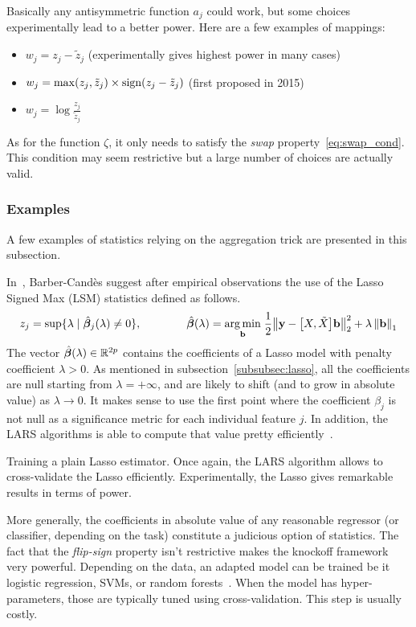 Basically any antisymmetric function $a_j$ could work, but some choices experimentally lead to a better power.
Here are a few examples of mappings:
\begin{itemize}
    \item $w_j = z_j - \tilde{z}_j$ (experimentally gives highest power in many cases)
    \item $w_j = \max(z_j, \tilde{z}_j) \times \operatorname*{sign}(z_j - \tilde{z}_j)$ (first proposed in 2015)
    \item $w_j = \log\frac{z_j}{\tilde{z}_j}$
\end{itemize}
As for the function $\zeta$, it only needs to satisfy the \emph{swap} property~\ref{eq:swap_cond}.
This condition may seem restrictive but a large number of choices are actually valid.

\subsubsection{Examples}\label{subsubsec:sce}

A few examples of statistics relying on the aggregation trick are presented in this subsection.

In~\cite{fixed_x_knockoffs}, Barber-Candès suggest after empirical observations the use of the
Lasso Signed Max (LSM) statistics defined as follows.
\begin{equation}
    z_j = \sup\{\lambda \mid \hat{\bm{\beta}}_j(\lambda) \neq 0\}
    ,\qquad\qquad
    \hat{\bm{\beta}}(\lambda) =
    \underset{\mathbf{b}}{\operatorname*{arg\,min}}\;
    \frac{1}{2}\big\lVert \mathbf{y} - \big[ X, \tilde{X} \big]\mathbf{b} \big\rVert_2^2 + \lambda\left\lVert\mathbf{b}\right\rVert_1
\end{equation}
The vector $\hat{\bm{\beta}}(\lambda) \in \mathbb{R}^{2p}$ contains the coefficients of a Lasso model
with penalty coefficient $\lambda > 0$.
As mentioned in subsection~\ref{subsubsec:lasso},
all the coefficients are null starting from $\lambda = +\infty$,
and are likely to shift (and to grow in absolute value) as $\lambda \to 0$.
It makes sense to use the first point where the coefficient $\beta_j$ is not null
as a significance metric for each individual feature $j$.
In addition, the LARS algorithms is able to compute that value pretty efficiently~\cite{lars_complexity}.

Training a plain Lasso estimator.
Once again, the LARS algorithm allows to cross-validate the Lasso efficiently.
Experimentally, the Lasso gives remarkable results in terms of power.

More generally, the coefficients in absolute value of any reasonable regressor
(or classifier, depending on the task) constitute a judicious option of statistics.
The fact that the \emph{flip-sign} property isn't restrictive makes the knockoff framework very powerful.
Depending on the data, an adapted model can be trained be it logistic regression,
SVMs, or random forests~\cite{random_forests}.
When the model has hyper-parameters, those are typically tuned using cross-validation.
This step is usually costly.

